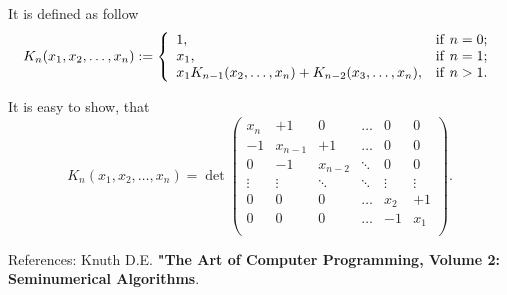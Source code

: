 \documentclass[12pt]{article}
\begin{document}
It is defined as follow
$$
K_n(x_1,x_2,\dots,x_n):=
\left\{
\begin{array}{ll}
 1, & {\rm if~} n=0;\\
 x_1, & {\rm if~} n=1;\\
 x_1 K_{n-1}(x_2,\dots,x_n) + K_{n-2}(x_3,\dots,x_n), & {\rm if~} n>1.\\
\end{array}
\right.
$$

It is easy to show, that
$$
K_n(x_1,x_2,\dots,x_n)=
\det
\left(
 \begin{array}{rrrrrr}
   x_n &  +1  &  0  & \dots &  0  &  0  \\
    -1  &x_{n-1}&  +1  & \dots &  0  &  0  \\
    0  &  -1  &  x_{n-2}  & \ddots &  0  &  0  \\

   \vdots & \vdots & \ddots & \ddots & \vdots & \vdots \\

    0  &  0  &  0  & \dots &  x_2  &  +1  \\
    0  &  0  &  0  & \dots &  -1  &  x_1  \\
 \end{array}
\right).
$$

References: Knuth D.E. {\bf "The Art of Computer Programming, Volume 2: Seminumerical Algorithms}.
\end{document}
